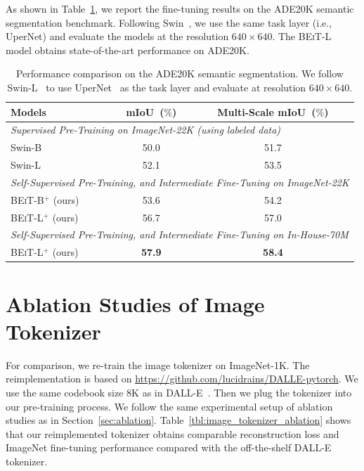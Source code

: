 \documentclass{article}
\newcommand\our{\textsc{BEiT}}
\begin{document}
As shown in Table~\ref{tbl:supervised:pt:ade20k}, we report the fine-tuning results on the ADE20K semantic segmentation benchmark.
Following Swin~\citep{swin}, we use the same task layer (i.e., UperNet) and evaluate the models at the resolution $640\times640$.
The \our{}-L model obtains state-of-the-art performance on ADE20K.


\begin{table}[H]
\centering
\begin{tabular}{@{}lcc}
\toprule
\bf Models & \bf mIoU~($\%$)  & \bf Multi-Scale mIoU~($\%$) \\
\midrule
\multicolumn{3}{l}{\textit{Supervised Pre-Training on ImageNet-22K (using labeled data)}} \\
Swin-B~\citep{swin} & 50.0 & 51.7 \\
Swin-L~\citep{swin} & 52.1 & 53.5 \\
\midrule
\multicolumn{3}{l}{\textit{Self-Supervised Pre-Training, and Intermediate Fine-Tuning on ImageNet-22K}} \\
\our{}-B$^+$ (ours)                         & 53.6 & 54.2 \\
\our{}-L$^+$ (ours)                         & 56.7 & 57.0 \\
\midrule
\multicolumn{3}{l}{\textit{Self-Supervised Pre-Training, and Intermediate Fine-Tuning on In-House-70M}} \\
\our{}-L$^+$ (ours)                         & \bf 57.9 & \bf 58.4 \\
\bottomrule
\end{tabular}
\caption{
Performance comparison on the ADE20K semantic segmentation.
We follow Swin-L~\citep{swin} to use UperNet~\citep{upernet} as the task layer and evaluate at resolution $640\times640$.
}
\label{tbl:supervised:pt:ade20k}
\end{table}


\section{Ablation Studies of Image Tokenizer}
\label{app:tokenizer}

For comparison, we re-train the image tokenizer on ImageNet-1K.
The reimplementation is based on \url{https://github.com/lucidrains/DALLE-pytorch}.
We use the same codebook size 8K as in DALL-E~\citep{dalle}.
Then we plug the tokenizer into our pre-training process.
We follow the same experimental setup of ablation studies as in Section~\ref{sec:ablation}.
Table~\ref{tbl:image_tokenizer_ablation} shows that our reimplemented tokenizer obtains comparable reconstruction loss and ImageNet fine-tuning performance compared with the off-the-shelf DALL-E tokenizer.
\end{document}
